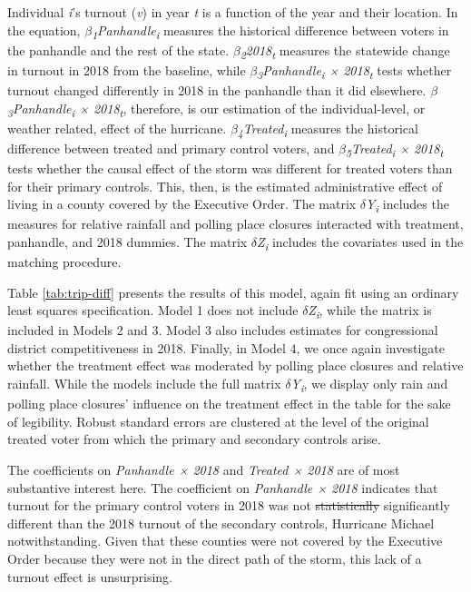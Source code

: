 \documentclass[
  12pt,
]{article}
\begin{document}
Individual \emph{i}'s turnout (\emph{v}) in year \emph{t} is a function of the year and their location. In the equation, \emph{\(\beta\)\textsubscript{1}Panhandle\textsubscript{i}} measures the historical difference between voters in the panhandle and the rest of the state. \emph{\(\beta\)\textsubscript{2}2018\textsubscript{t}} measures the statewide change in turnout in 2018 from the baseline, while \emph{\(\beta\)\textsubscript{3}Panhandle\textsubscript{i} × 2018\textsubscript{t}} tests whether turnout changed differently in 2018 in the panhandle than it did elsewhere. \emph{\(\beta\)\textsubscript{3}Panhandle\textsubscript{i} × 2018\textsubscript{t}}, therefore, is our estimation of the individual-level, or weather related, effect of the hurricane. \emph{\(\beta\)\textsubscript{4}Treated\textsubscript{i}} measures the historical difference between treated and primary control voters, and \emph{\(\beta\)\textsubscript{5}Treated\textsubscript{i} × 2018\textsubscript{t}} tests whether the causal effect of the storm was different for treated voters than for their primary controls. This, then, is the estimated administrative effect of living in a county covered by the Executive Order. The matrix \emph{\(\delta\)Y\textsubscript{i}} includes the measures for relative rainfall and polling place closures interacted with treatment, panhandle, and 2018 dummies. The matrix \emph{\(\delta\)Z\textsubscript{i}} includes the covariates used in the matching procedure.

Table \ref{tab:trip-diff} presents the results of this model, again fit using an ordinary least squares specification. Model 1 does not include \emph{\(\delta\)Z\textsubscript{i}}, while the matrix is included in Models 2 and 3. Model 3 also includes estimates for congressional district competitiveness in 2018. Finally, in Model 4, we once again investigate whether the treatment effect was moderated by polling place closures and relative rainfall. While the models include the full matrix \emph{\(\delta\)Y\textsubscript{i}}, we display only rain and polling place closures' influence on the treatment effect in the table for the sake of legibility. Robust standard errors are clustered at the level of the original treated voter from which the primary and secondary controls arise.

\begin{singlespace}


\end{singlespace}

The coefficients on \emph{Panhandle × 2018} and \emph{Treated × 2018} are of most substantive interest here. The coefficient on \emph{Panhandle × 2018} indicates that turnout for the primary control voters in 2018 was not \sout{statistically} significantly different than the 2018 turnout of the secondary controls, Hurricane Michael notwithstanding. Given that these counties were not covered by the Executive Order because they were not in the direct path of the storm, this lack of a turnout effect is unsurprising.
\end{document}

